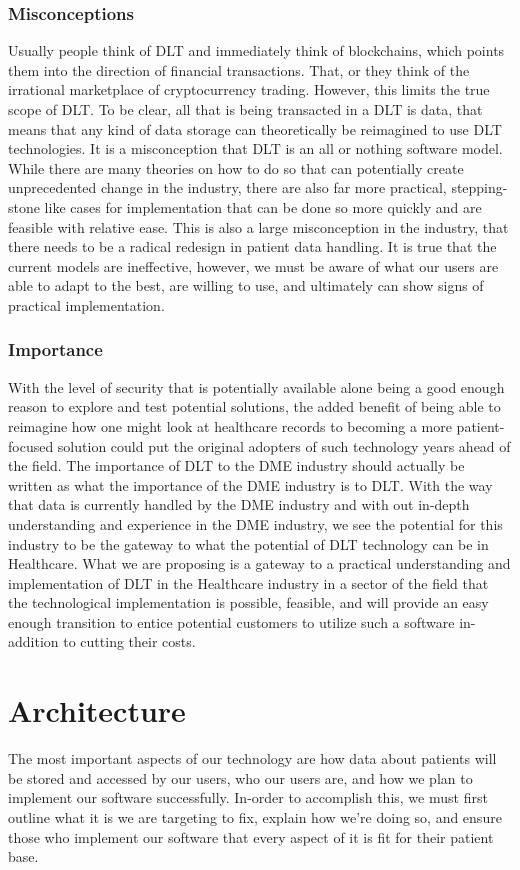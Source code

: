 \documentclass[12pt]{article}
\begin{document}
    \subsubsection{Misconceptions}
    Usually people think of DLT and immediately think of blockchains, which points them into the direction of financial transactions. That, or they think of the irrational marketplace of cryptocurrency trading. However, this limits the true scope of DLT. To be clear, all that is being transacted in a DLT is data, that means that any kind of data storage can theoretically be reimagined to use DLT technologies. It is a misconception that DLT is an all or nothing software model. While there are many theories on how to do so that can potentially create unprecedented change in the industry, there are also far more practical, stepping-stone like cases for implementation that can be done so more quickly and are feasible with relative ease. This is also a large misconception in the industry, that there needs to be a radical redesign in patient data handling. It is true that the current models are ineffective, however, we must be aware of what our users are able to adapt to the best, are willing to use, and ultimately can show signs of practical implementation.

    \subsubsection{Importance}
    With the level of security that is potentially available alone being a good enough reason to explore and test potential solutions, the added benefit of being able to reimagine how one might look at healthcare records to becoming a more patient-focused solution could put the original adopters of such technology years ahead of the field. The importance of DLT to the DME industry should actually be written as what the importance of the DME industry is to DLT. With the way that data is currently handled by the DME industry and with out in-depth understanding and experience in the DME industry, we see the potential for this industry to be the gateway to what the potential of DLT technology can be in Healthcare. What we are proposing is a gateway to a practical understanding and implementation of DLT in the Healthcare industry in a sector of the field that the technological implementation is possible, feasible, and will provide an easy enough transition to entice potential customers to utilize such a software in-addition to cutting their costs.

\section{Architecture}
The most important aspects of our technology are how data about patients will be stored and accessed by our users, who our users are, and how we plan to implement our software successfully. In-order to accomplish this, we must first outline what it is we are targeting to fix, explain how we’re doing so, and ensure those who implement our software that every aspect of it is fit for their patient base.
\end{document}
